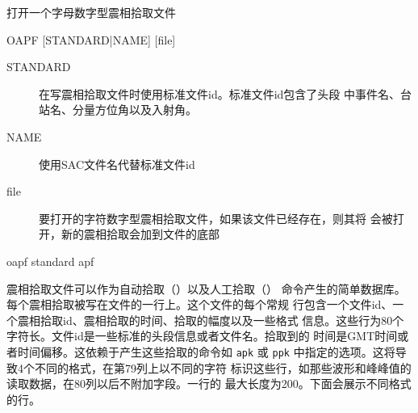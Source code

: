 \label{cmd:oapf}

打开一个字母数字型震相拾取文件

\begin{SACSTX}
OAPF [STANDARD|NAME] [file]
\end{SACSTX}

\begin{description}
\item [STANDARD] 在写震相拾取文件时使用标准文件id。标准文件id包含了头段
    中事件名、台站名、分量方位角以及入射角。
\item [NAME] 使用SAC文件名代替标准文件id
\item [file] 要打开的字符数字型震相拾取文件，如果该文件已经存在，则其将
    会被打开，新的震相拾取会加到文件的底部
\end{description}

\begin{SACDFT}
oapf standard apf
\end{SACDFT}

震相拾取文件可以作为自动拾取（）以及人工拾取（）
命令产生的简单数据库。每个震相拾取被写在文件的一行上。这个文件的每个常规
行包含一个文件id、一个震相拾取id、震相拾取的时间、拾取的幅度以及一些格式
信息。这些行为80个字符长。文件id是一些标准的头段信息或者文件名。拾取到的
时间是GMT时间或者时间偏移。这依赖于产生这些拾取的命令如 \texttt{apk} 或
\texttt{ppk} 中指定的选项。这将导致4个不同的格式，在第79列上以不同的字符
标识这些行，如那些波形和峰峰值的读取数据，在80列以后不附加字段。一行的
最大长度为200。下面会展示不同格式的行。
